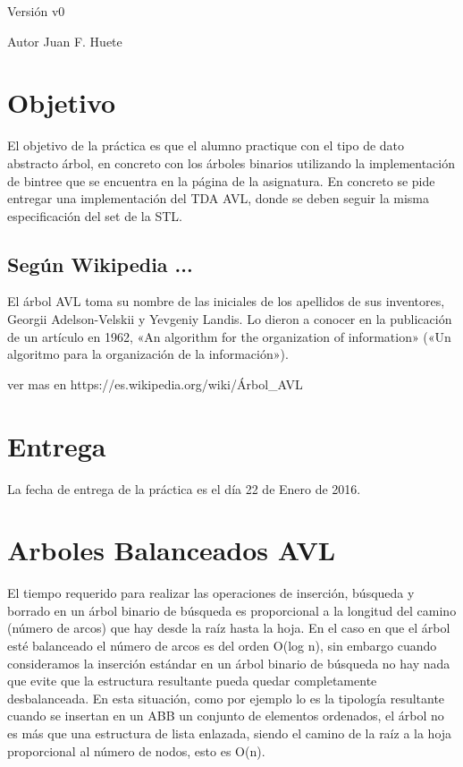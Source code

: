 \begin{DoxyVersion}{Versión}
v0 
\end{DoxyVersion}
\begin{DoxyAuthor}{Autor}
Juan F. Huete
\end{DoxyAuthor}
\hypertarget{index_Objetivo}{}\section{Objetivo}\label{index_Objetivo}
El objetivo de la práctica es que el alumno practique con el tipo de dato abstracto árbol, en concreto con los árboles binarios utilizando la implementación de bintree que se encuentra en la página de la asignatura. En concreto se pide entregar una implementación del T\+D\+A A\+V\+L, donde se deben seguir la misma especificación del set de la S\+T\+L.\hypertarget{index_wiki}{}\subsection{Según Wikipedia ...}\label{index_wiki}
El árbol A\+V\+L toma su nombre de las iniciales de los apellidos de sus inventores, Georgii Adelson-\/\+Velskii y Yevgeniy Landis. Lo dieron a conocer en la publicación de un artículo en 1962, «\+An algorithm for the organization of information» («\+Un algoritmo para la organización de la información»).


\begin{DoxyCode}
ver mas en https:\textcolor{comment}{//es.wikipedia.org/wiki/Árbol\_AVL}
\end{DoxyCode}
 \hypertarget{index_Fecha}{}\section{Entrega}\label{index_Fecha}
La fecha de entrega de la práctica es el día 22 de Enero de 2016.\hypertarget{index_Documentacion}{}\section{Arboles Balanceados A\+V\+L}\label{index_Documentacion}
El tiempo requerido para realizar las operaciones de inserción, búsqueda y borrado en un árbol binario de búsqueda es proporcional a la longitud del camino (número de arcos) que hay desde la raíz hasta la hoja. En el caso en que el árbol esté balanceado el número de arcos es del orden O(log n), sin embargo cuando consideramos la inserción estándar en un árbol binario de búsqueda no hay nada que evite que la estructura resultante pueda quedar completamente desbalanceada. En esta situación, como por ejemplo lo es la tipología resultante cuando se insertan en un A\+B\+B un conjunto de elementos ordenados, el árbol no es más que una estructura de lista enlazada, siendo el camino de la raíz a la hoja proporcional al número de nodos, esto es O(n).

